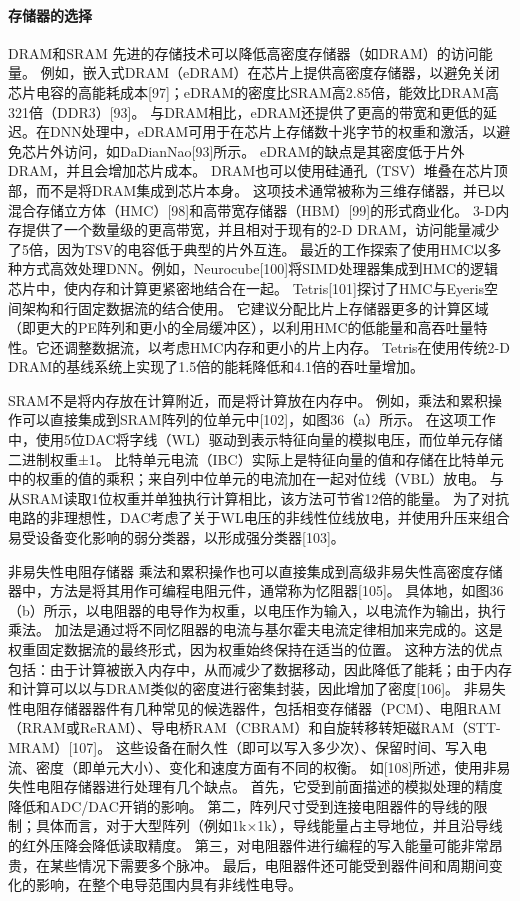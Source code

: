 \paragraph{存储器的选择}
DRAM和SRAM
先进的存储技术可以降低高密度存储器（如DRAM）的访问能量。
例如，嵌入式DRAM（eDRAM）在芯片上提供高密度存储器，以避免关闭芯片电容的高能耗成本[97]；eDRAM的密度比SRAM高2.85倍，能效比DRAM高321倍（DDR3）[93]。
与DRAM相比，eDRAM还提供了更高的带宽和更低的延迟。在DNN处理中，eDRAM可用于在芯片上存储数十兆字节的权重和激活，以避免芯片外访问，如DaDianNao[93]所示。
eDRAM的缺点是其密度低于片外DRAM，并且会增加芯片成本。
DRAM也可以使用硅通孔（TSV）堆叠在芯片顶部，而不是将DRAM集成到芯片本身。
这项技术通常被称为三维存储器，并已以混合存储立方体（HMC）[98]和高带宽存储器（HBM）[99]的形式商业化。
3-D内存提供了一个数量级的更高带宽，并且相对于现有的2-D DRAM，访问能量减少了5倍，因为TSV的电容低于典型的片外互连。
最近的工作探索了使用HMC以多种方式高效处理DNN。例如，Neurocube[100]将SIMD处理器集成到HMC的逻辑芯片中，使内存和计算更紧密地结合在一起。
Tetris[101]探讨了HMC与Eyeris空间架构和行固定数据流的结合使用。
它建议分配比片上存储器更多的计算区域（即更大的PE阵列和更小的全局缓冲区），以利用HMC的低能量和高吞吐量特性。它还调整数据流，以考虑HMC内存和更小的片上内存。
Tetris在使用传统2-D DRAM的基线系统上实现了1.5倍的能耗降低和4.1倍的吞吐量增加。

SRAM不是将内存放在计算附近，而是将计算放在内存中。
例如，乘法和累积操作可以直接集成到SRAM阵列的位单元中[102]，如图36（a）所示。
在这项工作中，使用5位DAC将字线（WL）驱动到表示特征向量的模拟电压，而位单元存储二进制权重±1。
比特单元电流（IBC）实际上是特征向量的值和存储在比特单元中的权重的值的乘积；来自列中位单元的电流加在一起对位线（VBL）放电。
与从SRAM读取1位权重并单独执行计算相比，该方法可节省12倍的能量。
为了对抗电路的非理想性，DAC考虑了关于WL电压的非线性位线放电，并使用升压来组合易受设备变化影响的弱分类器，以形成强分类器[103]。

非易失性电阻存储器
乘法和累积操作也可以直接集成到高级非易失性高密度存储器中，方法是将其用作可编程电阻元件，通常称为忆阻器[105]。
具体地，如图36（b）所示，以电阻器的电导作为权重，以电压作为输入，以电流作为输出，执行乘法。
加法是通过将不同忆阻器的电流与基尔霍夫电流定律相加来完成的。这是权重固定数据流的最终形式，因为权重始终保持在适当的位置。
这种方法的优点包括：由于计算被嵌入内存中，从而减少了数据移动，因此降低了能耗；由于内存和计算可以以与DRAM类似的密度进行密集封装，因此增加了密度[106]。
非易失性电阻存储器器件有几种常见的候选器件，包括相变存储器（PCM）、电阻RAM（RRAM或ReRAM）、导电桥RAM（CBRAM）和自旋转移转矩磁RAM（STT-MRAM）[107]。
这些设备在耐久性（即可以写入多少次）、保留时间、写入电流、密度（即单元大小）、变化和速度方面有不同的权衡。
如[108]所述，使用非易失性电阻存储器进行处理有几个缺点。
首先，它受到前面描述的模拟处理的精度降低和ADC/DAC开销的影响。
第二，阵列尺寸受到连接电阻器件的导线的限制；具体而言，对于大型阵列（例如1k×1k），导线能量占主导地位，并且沿导线的红外压降会降低读取精度。
第三，对电阻器件进行编程的写入能量可能非常昂贵，在某些情况下需要多个脉冲。
最后，电阻器件还可能受到器件间和周期间变化的影响，在整个电导范围内具有非线性电导。


